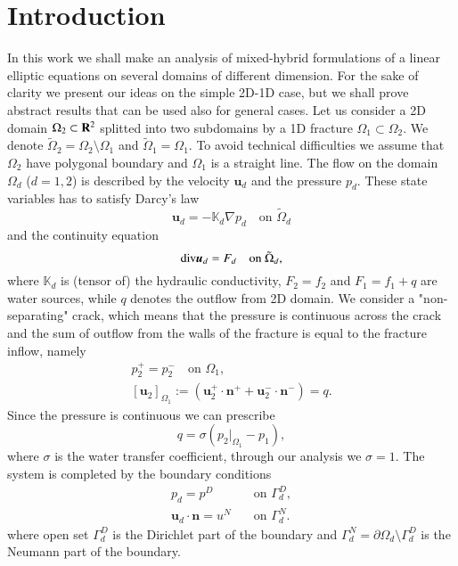 \documentclass{elsarticle}
\def\div{{\rm div}}
\def\grad{\nabla}
\def\Real{{\rm\bf R}}
\def\vc#1{\mathbf{\boldsymbol{#1}}}     %
\def\tn#1{{\mathbb{#1}}}    %
\def\prtl{\partial}                                        %
\def\vl{{\vc{u}}}
\begin{document}
\section{Introduction}
In this work we shall make an analysis of mixed-hybrid formulations of a linear elliptic equations on several domains of different dimension. For the sake of clarity we present our ideas on the simple 2D-1D case, but we shall prove abstract 
results that can be used also for general cases. Let us consider a 2D domain $\Omega_2\subset \Real^2$
splitted into two subdomains by a 1D fracture $\Omega_1\subset\Omega_2$.
We denote $ \tilde\Omega_2=\Omega_2\setminus\Omega_1$ and $\tilde\Omega_1=\Omega_1$.
To avoid technical difficulties we assume that $\Omega_2$ have polygonal boundary and $\Omega_1$ is a straight line. The flow on the domain $\Omega_d$ ($d=1,2$) is described by the velocity $\vl_d$ and the pressure
$p_d$. These state variables has to satisfy Darcy's law
\begin{equation}\label{Darcy}
        \vl_d=-\tn K_d \grad p_d \quad \text{on }\tilde \Omega_d
\end{equation}
and the continuity equation
\begin{equation}\label{RC}
        \div \vl_d = F_d        \quad \text{on }\tilde \Omega_d,
\end{equation}
where $\tn K_d$ is (tensor of) the hydraulic conductivity, $F_2=f_2$ and $F_1=f_1+q$
are water sources, while $q$ denotes the outflow from 2D domain. We consider a "non-separating" crack, which means that the pressure is continuous across the crack and the sum of outflow from the walls of the fracture is equal to the fracture inflow,
namely  
\begin{gather*}
        p_2^{+} = p_2^{-}\quad \text{on }\Omega_1,\\
        [\vl_2]_{\Omega_1}:= (\vc \vl_2^{+}\cdot\vc n^{+} + \vc u_2^{-}\cdot\vc n^{-}) = q.
\end{gather*}
Since the pressure is continuous we can prescribe
\begin{equation}
 \label{Qflux}
 q=\sigma(p_2|_{\Omega_1} - p_1),
\end{equation}
where $\sigma$ is the water transfer coefficient, through our analysis we $\sigma=1$. The system is completed by the boundary conditions
\begin{align*}
        p_d = p^D&\quad \text{on }\Gamma_d^D,\\
        \vl_d\cdot\vc n= u^N&\quad \text{on }\Gamma_d^N.
\end{align*}
where open set $\Gamma_d^D$ is the Dirichlet part of the boundary and $\Gamma_d^N=\prtl\Omega_d\setminus\Gamma_d^D$ is the Neumann part of the boundary.
\end{document}

